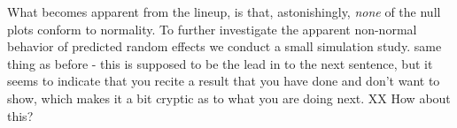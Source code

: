\documentclass[12pt]{article} %
\newcommand{\hh}[1]{{\color{orange} #1}}
\newcommand{\al}[1]{{\color{red} #1}}
\begin{document}
What becomes apparent from the lineup, is that, astonishingly, {\it none} of the null plots conform to normality. \al{To further investigate the apparent non-normal behavior of predicted random effects we conduct a small simulation study.}
\hh{same thing as before - this is supposed to be the lead in to the next sentence, but it seems to indicate that you recite a result that you have done and don't want to show, which makes it a bit cryptic as to what you are doing next.}
\al{XX How about this?}


\end{document}
